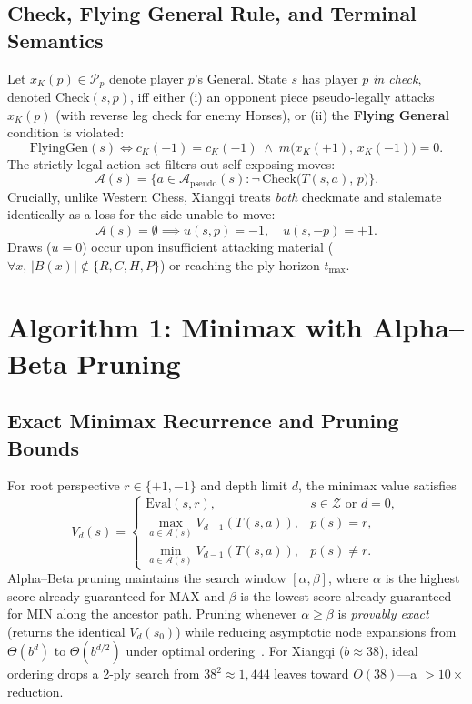 \documentclass[conference]{IEEEtran}
\begin{document}
\subsection{Check, Flying General Rule, and Terminal Semantics}
Let $x_K(p) \in \mathcal{P}_p$ denote player $p$'s General. State $s$ has player $p$ \emph{in check}, denoted $\mathrm{Check}(s, p)$, iff either (i) an opponent piece pseudo-legally attacks $x_K(p)$ (with reverse leg check for enemy Horses), or (ii) the \textbf{Flying General} condition is violated:
\begin{equation}
\mathrm{FlyingGen}(s) \iff c_{K}(+1) = c_{K}(-1) \;\land\; m\big(x_K(+1),\, x_K(-1)\big) = 0.
\end{equation}
The strictly legal action set filters out self-exposing moves:
\begin{equation}
\mathcal{A}(s) = \big\{ a \in \mathcal{A}_{\text{pseudo}}(s) : \neg\,\mathrm{Check}\big(T(s,a),\, p\big) \big\}.
\end{equation}
Crucially, unlike Western Chess, Xiangqi treats \emph{both} checkmate and stalemate identically as a loss for the side unable to move:
\begin{equation}
\mathcal{A}(s) = \emptyset \implies u(s, p) = -1,\quad u(s, -p) = +1.
\end{equation}
Draws ($u=0$) occur upon insufficient attacking material ($\forall x,\, |B(x)| \notin \{R,C,H,P\}$) or reaching the ply horizon $t_{\max}$.

\section{Algorithm 1: Minimax with Alpha--Beta Pruning}
\subsection{Exact Minimax Recurrence and Pruning Bounds}
For root perspective $r \in \{+1,-1\}$ and depth limit $d$, the minimax value satisfies
\begin{equation}
V_d(s) =
\begin{cases}
\mathrm{Eval}(s, r), & s \in \mathcal{Z} \text{ or } d = 0, \\
\max_{a \in \mathcal{A}(s)} V_{d-1}(T(s,a)), & p(s) = r, \\
\min_{a \in \mathcal{A}(s)} V_{d-1}(T(s,a)), & p(s) \neq r.
\end{cases}
\end{equation}
Alpha--Beta pruning maintains the search window $[\alpha, \beta]$, where $\alpha$ is the highest score already guaranteed for MAX and $\beta$ is the lowest score already guaranteed for MIN along the ancestor path. Pruning whenever $\alpha \ge \beta$ is \emph{provably exact} (returns the identical $V_d(s_0)$) while reducing asymptotic node expansions from $\Theta(b^d)$ to $\Theta(b^{d/2})$ under optimal ordering~\cite{knuth1975}. For Xiangqi ($b \approx 38$), ideal ordering drops a 2-ply search from $38^2 \approx 1{,}444$ leaves toward $O(38)$---a $>10\times$ reduction.
\end{document}
